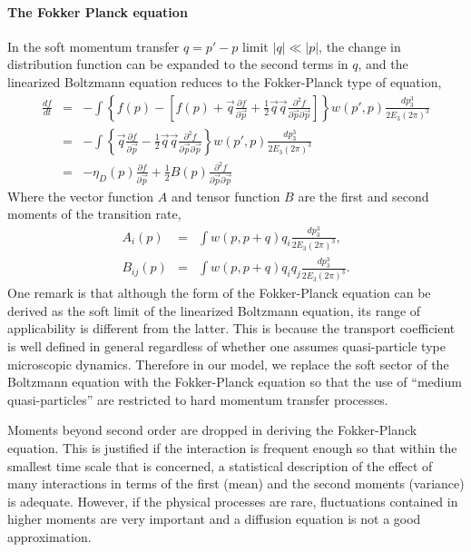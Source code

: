 \paragraph{The Fokker Planck equation}
In the soft momentum transfer $q = p'-p$ limit  $|q| \ll |p|$, the change in distribution function can be expanded to the second terms in $q$, and the linearized Boltzmann equation reduces to the Fokker-Planck type of equation,
\begin{eqnarray}
\frac{df}{dt} &=& - \int \left\{
f(p) - \left[f(p) +  \vec{q}\frac{\partial f}{\partial\vec{p}} + \frac{1}{2}\vec{q}\vec{q}\frac{\partial^2 f}{\partial\vec{p} \partial\vec{p}} \right]
\right\} w(p',p)\frac{dp_3^3}{2E_3 (2\pi)^3} \\
&=& - \int \left\{ \vec{q}\frac{\partial f}{\partial\vec{p}} - \frac{1}{2}\vec{q}\vec{q}\frac{\partial^2 f}{\partial\vec{p} \partial\vec{p}}
\right\} w(p',p)\frac{dp_3^3}{2E_3 (2\pi)^3} \\
&=&  -\eta_D(p) \frac{\partial f}{\partial\vec{p}} + \frac{1}{2}B(p)\frac{\partial^2 f}{\partial\vec{p} \partial\vec{p}}
\end{eqnarray}
Where the vector function $A$ and tensor function $B$ are the first and second moments of the transition rate,
\begin{eqnarray}
A_i(p) &=& \int w(p,p+q) q_i \frac{dp_3^3}{2E_3 (2\pi)^3},\\
B_{ij}(p) &=& \int w(p,p+q) q_i q_j \frac{dp_3^3}{2E_3 (2\pi)^3}.
\end{eqnarray}
One remark is that although the form of the Fokker-Planck equation can be derived as the soft limit of the linearized Boltzmann equation, its range of applicability is different from the latter.
This is because the transport coefficient is well defined in general regardless of whether one assumes quasi-particle type microscopic dynamics.
Therefore in our model, we replace the soft sector of the Boltzmann equation with the Fokker-Planck equation so that the use of ``medium quasi-particles'' are restricted to hard momentum transfer processes.

Moments beyond second order are dropped in deriving the Fokker-Planck equation. 
This is justified if the interaction is frequent enough so that within the smallest time scale that is concerned, a statistical description of the effect of many interactions in terms of the first (mean) and the second moments (variance) is adequate.
However, if the physical processes are rare, fluctuations contained in higher moments are very important and a diffusion equation is not a good approximation.

